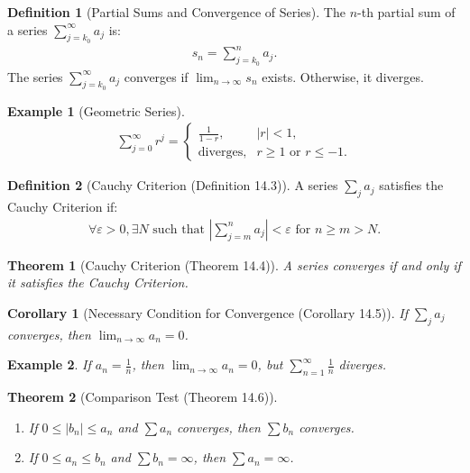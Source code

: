 \documentclass[7pt]{article}
\theoremstyle{definition}
\newtheorem{definition}{Definition}
\theoremstyle{plain}
\newtheorem{theorem}{Theorem}
\newtheorem{example}{Example}
\newtheorem{corollary}{Corollary}
\begin{document}
\begin{definition}[Partial Sums and Convergence of Series]
The $ n $-th partial sum of a series $ \sum_{j=k_0}^\infty a_j $ is:
\begin{align}
s_n = \sum_{j=k_0}^n a_j.
\end{align}
The series $ \sum_{j=k_0}^\infty a_j $ converges if $ \lim_{n \to \infty} s_n $ exists. Otherwise, it diverges.
\end{definition}

\begin{example}[Geometric Series]
\begin{align}
\sum_{j=0}^\infty r^j =
\begin{cases}
\frac{1}{1-r}, & |r| < 1, \\
\text{diverges}, & r \geq 1 \text{ or } r \leq -1.
\end{cases}
\end{align}
\end{example}

\begin{definition}[Cauchy Criterion (Definition 14.3)]
A series $ \sum_j a_j $ satisfies the Cauchy Criterion if:
\begin{align}
\forall \varepsilon > 0, \exists N \text{ such that } \left|\sum_{j=m}^n a_j\right| < \varepsilon \text{ for } n \geq m > N.
\end{align}
\end{definition}

\begin{theorem}[Cauchy Criterion (Theorem 14.4)]
A series converges if and only if it satisfies the Cauchy Criterion.
\end{theorem}

\begin{corollary}[Necessary Condition for Convergence (Corollary 14.5)]
If $ \sum_j a_j $ converges, then $ \lim_{n \to \infty} a_n = 0 $.
\end{corollary}

\begin{example}
If $ a_n = \frac{1}{n} $, then $ \lim_{n \to \infty} a_n = 0 $, but $ \sum_{n=1}^\infty \frac{1}{n} $ diverges.
\end{example}

\begin{theorem}[Comparison Test (Theorem 14.6)]

\begin{enumerate}
    \item If $ 0 \leq |b_n| \leq a_n $ and $ \sum a_n $ converges, then $ \sum b_n $ converges.
    \item If $ 0 \leq a_n \leq b_n $ and $ \sum b_n = \infty $, then $ \sum a_n = \infty $.
\end{enumerate}
\end{theorem}
\end{document}
